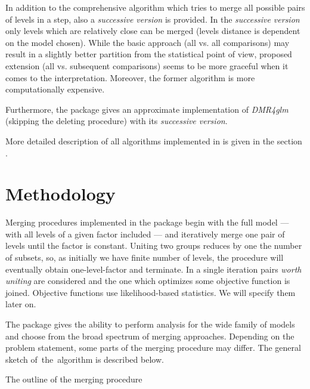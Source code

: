 In addition to the comprehensive algorithm which tries to merge all possible pairs of levels in a step, also a \emph{successive version} is provided. In the \emph{successive version} only levels which are relatively close can be merged (levels distance is dependent on the model chosen). While the basic approach (all vs. all comparisons) may result in a slightly better partition from the statistical point of view, proposed extension (all vs. subsequent comparisons) seems to be more graceful when it comes to the interpretation. Moreover, the former algorithm is more computationally expensive.

Furthermore, the \factorMerger package gives an approximate implementation of \emph{DMR4glm} (skipping the deleting procedure) with its \emph{successive version}.

More detailed description of all algorithms implemented in \factorMerger is given in the section .

\section{Methodology}\label{algs}

Merging procedures implemented in the \factorMerger package begin with the full model --- with all levels of a given factor included --- and iteratively merge one pair of levels until the factor is constant. Uniting two groups reduces by one the number of subsets, so, as initially we have finite number of levels, the procedure will eventually obtain one-level-factor and terminate. In a single iteration pairs \emph{worth uniting} are considered and the one which optimizes some objective function is joined. Objective functions use likelihood-based statistics. We will specify them later on. 

The \factorMerger package gives the ability to perform analysis for the wide family of models and choose from the broad spectrum of merging approaches. Depending on the problem statement, some parts of the merging procedure may differ. The general sketch of~the~algorithm is described below.

\begin{algorithm}[H]
\caption{The outline of the merging procedure}
\label{outline}
\begin{algorithmic}[2]

\EndWhile
    \EndFunction
\end{algorithmic}
\end{algorithm}


